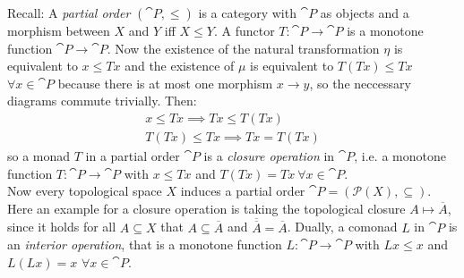 \begin{example}
Recall: A \textit{partial order} $(\cat{P},\le)$ is a category with $\cat{P}$ as objects and 
a morphism between $X$ and $Y$ iff $X \le Y$.
A functor $T\colon \cat{P} \to \cat{P}$ is a monotone function $\cat{P}\to \cat{P}$.
Now the existence of the natural transformation $\eta$ is equivalent to
$x \le Tx$
and the existence of $\mu$ is equivalent to
$T(Tx) \le Tx$ $\forall x \in \cat{P}$
because there is at most one morphism $x \to y$, so the neccessary diagrams commute trivially.
Then:
\begin{align*}
    x \le Tx \implies Tx \le T(Tx) \\
    T(Tx) \le Tx \implies Tx = T(Tx)
\end{align*}
so a monad $T$ in a partial order $\cat{P}$ is a \textit{closure operation} in $\cat{P}$, i.e. 
a monotone function $T \colon \cat{P} \to \cat{P}$ 
with $x \le Tx$ and $T(Tx)=Tx \ \forall x \in \cat{P}.$ \\
Now every topological space $X$ induces a partial order $\cat{P} = (\mathscr{P}(X),\subseteq)$.
Here an example for a closure operation is taking the topological closure $A \mapsto \overline{A}$,
since it holds for all $A \subseteq X$ that $A \subseteq \overline{A}$ and
$\overline{\overline{A}} = \overline{A}$.
Dually, a comonad $L$ in $\cat{P}$ is an \textit{interior operation}, that is a 
monotone function $L \colon \cat{P} \to \cat{P}$ with $Lx \leq x$ and $L(Lx)=x$ $\forall x \in \cat{P}$.
\end{example}

